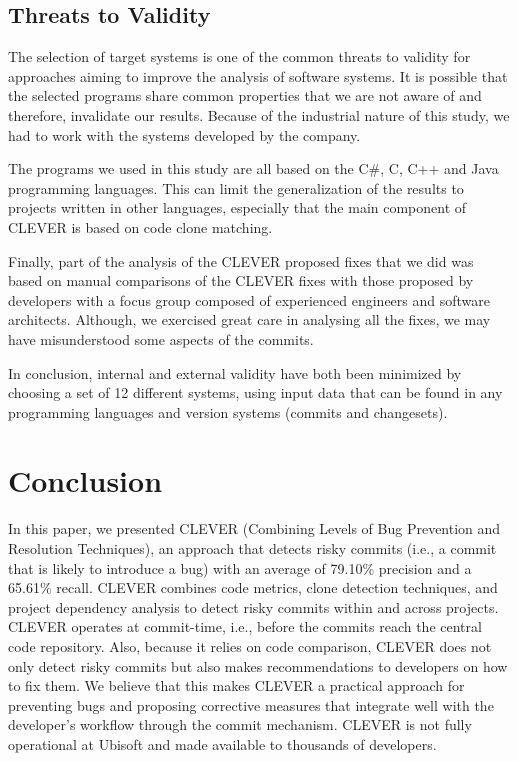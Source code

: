 \documentclass[sigconf]{acmart}
\begin{document}
\subsection{Threats to Validity}\label{threats-to-validity}

The selection of target systems is one of the common threats to validity
for approaches aiming to improve the analysis of software systems. It is
possible that the selected programs share common properties that we are
not aware of and therefore, invalidate our results. Because of the
industrial nature of this study, we had to work with the systems
developed by the company.

The programs we used in this study are all based on the C\#, C, C++ and
Java programming languages. This can limit the generalization of the
results to projects written in other languages, especially that the main
component of CLEVER is based on code clone matching.

Finally, part of the analysis of the CLEVER proposed fixes that we did
was based on manual comparisons of the CLEVER fixes with those proposed
by developers with a focus group composed of experienced engineers and
software architects. Although, we exercised great care in analysing all
the fixes, we may have misunderstood some aspects of the commits.

In conclusion, internal and external validity have both been minimized
by choosing a set of 12 different systems, using input data that can be
found in any programming languages and version systems (commits and
changesets).

\section{Conclusion}\label{sec:conclusion}

In this paper, we presented CLEVER (Combining Levels of Bug Prevention
and Resolution Techniques), an approach that detects risky commits
(i.e., a commit that is likely to introduce a bug) with an average of
79.10\% precision and a 65.61\% recall. CLEVER combines code metrics,
clone detection techniques, and project dependency analysis to detect
risky commits within and across projects. CLEVER operates at
commit-time, i.e., before the commits reach the central code repository.
Also, because it relies on code comparison, CLEVER does not only detect
risky commits but also makes recommendations to developers on how to fix
them. We believe that this makes CLEVER a practical approach for
preventing bugs and proposing corrective measures that integrate well
with the developer's workflow through the commit mechanism. CLEVER is
not fully operational at Ubisoft and made available to thousands of
developers.
\end{document}
